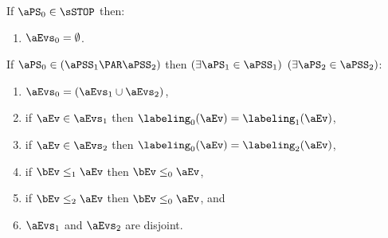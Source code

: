 \begin{definition}
  If $\aPS_0\in\sSTOP$ then:
  \begin{enumerate}
    \item $\aEvs_0 = \emptyset$.
  \end{enumerate}

  \noindent
  If $\aPS_0 \in (\aPSS_1\PAR\aPSS_2)$ then  
  $(\exists\aPS_1\in\aPSS_1)$ $(\exists\aPS_2\in\aPSS_2)$:
  \begin{enumerate}
  \item $\aEvs_0 = (\aEvs_1\cup\aEvs_2)$,
  \item if $\aEv\in\aEvs_1$ then $\labeling_0(\aEv) = \labeling_1(\aEv)$, 
  \item if $\aEv\in\aEvs_2$ then $\labeling_0(\aEv) = \labeling_2(\aEv)$,
  \item if $\bEv\le_1\aEv$ then $\bEv\le_0\aEv$, 
  \item if $\bEv\le_2\aEv$ then $\bEv\le_0\aEv$, and
    \setcounter{pomsetParXount}{\value{enumi}}
  \item $\aEvs_1$ and $\aEvs_2$ are disjoint.
    \setcounter{pomsetParDisjointXount}{\value{enumi}}
  \end{enumerate}



\end{definition}
